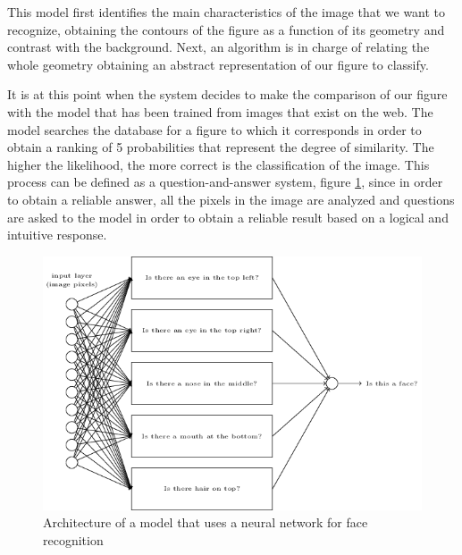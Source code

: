 This model first identifies the main characteristics of the image that we want to recognize, obtaining the contours of the figure as a function of its geometry and contrast with the background. Next, an algorithm is in charge of relating the whole geometry obtaining an abstract representation of our figure to classify.

It is at this point when the system decides to make the comparison of our figure with the model that has been trained from images that exist on the web. The model searches the database for a figure to which it corresponds in order to obtain a ranking of 5 probabilities that represent the degree of similarity. The higher the likelihood, the more correct is the classification of the image. This process can be defined as a question-and-answer system, figure \ref{neural_net}, since in order to obtain a reliable answer, all the pixels in the image are analyzed and questions are asked to the model in order to obtain a reliable result based on a logical and intuitive response.

\begin{figure}[!ht]
\centering
\includegraphics[scale=1.0]{figures/neural_net.png}
\caption{Architecture of a model that uses a neural network for face recognition}
\label{neural_net}
\end{figure}




